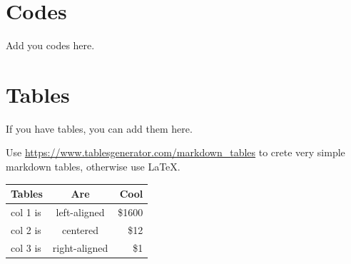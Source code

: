 \documentclass[mstat,12pt]{unswthesis}
\begin{document}
\hypertarget{codes}{%
\section*{\texorpdfstring{\textbf{Codes}}{Codes}}\label{codes}}

Add you codes here.

\hypertarget{tables}{%
\section*{\texorpdfstring{\textbf{Tables}}{Tables}}\label{tables}}

If you have tables, you can add them here.

Use \url{https://www.tablesgenerator.com/markdown_tables} to crete very
simple markdown tables, otherwise use \LaTeX.

\begin{longtable}[]{@{}lcr@{}}
\toprule
Tables & Are & Cool \\
\midrule
\endhead
col 1 is & left-aligned & \$1600 \\
col 2 is & centered & \$12 \\
col 3 is & right-aligned & \$1 \\
\bottomrule
\end{longtable}
\end{document}
